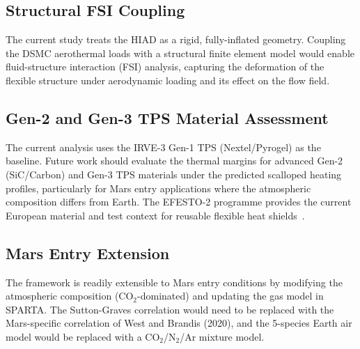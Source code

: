 \subsection{Structural FSI Coupling}
The current study treats the HIAD as a rigid, fully-inflated geometry. Coupling the DSMC aerothermal loads with a structural finite element model would enable fluid-structure interaction (FSI) analysis, capturing the deformation of the flexible structure under aerodynamic loading and its effect on the flow field.

\subsection{Gen-2 and Gen-3 TPS Material Assessment}
The current analysis uses the IRVE-3 Gen-1 TPS (Nextel/Pyrogel) as the baseline. Future work should evaluate the thermal margins for advanced Gen-2 (SiC/Carbon) and Gen-3 TPS materials under the predicted scalloped heating profiles, particularly for Mars entry applications where the atmospheric composition differs from Earth. The EFESTO-2 programme provides the current European material and test context for reusable flexible heat shields~\cite{Guidotti2024EFESTO2}.

\subsection{Mars Entry Extension}
The framework is readily extensible to Mars entry conditions by modifying the atmospheric composition (CO$_2$-dominated) and updating the gas model in SPARTA. The Sutton-Graves correlation would need to be replaced with the Mars-specific correlation of West and Brandis (2020), and the 5-species Earth air model would be replaced with a CO$_2$/N$_2$/Ar mixture model.

